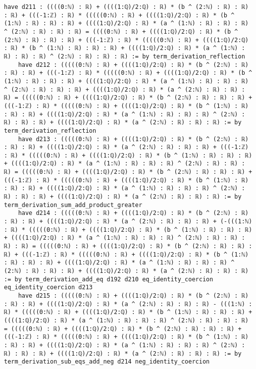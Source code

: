 \documentclass{article}
\begin{document}
\begin{tcolorbox}[colback=white!10, width=\linewidth]
\begin{lstlisting}[language=Lean4]
    have d211 : ((((0:ℕ) : ℝ) + ((((1:ℚ)/2:ℚ) : ℝ) * (b ^ (2:ℕ) : ℝ) : ℝ) : ℝ) + (((-1:ℤ) : ℝ) * (((((0:ℕ) : ℝ) + ((((1:ℚ)/2:ℚ) : ℝ) * (b ^ (1:ℕ) : ℝ) : ℝ) : ℝ) + ((((1:ℚ)/2:ℚ) : ℝ) * (a ^ (1:ℕ) : ℝ) : ℝ) : ℝ) ^ (2:ℕ) : ℝ) : ℝ) : ℝ) = ((((0:ℕ) : ℝ) + ((((1:ℚ)/2:ℚ) : ℝ) * (b ^ (2:ℕ) : ℝ) : ℝ) : ℝ) + (((-1:ℤ) : ℝ) * (((((0:ℕ) : ℝ) + ((((1:ℚ)/2:ℚ) : ℝ) * (b ^ (1:ℕ) : ℝ) : ℝ) : ℝ) + ((((1:ℚ)/2:ℚ) : ℝ) * (a ^ (1:ℕ) : ℝ) : ℝ) : ℝ) ^ (2:ℕ) : ℝ) : ℝ) : ℝ) := by term_derivation_reflection
    have d212 : (((((0:ℕ) : ℝ) + ((((1:ℚ)/2:ℚ) : ℝ) * (b ^ (2:ℕ) : ℝ) : ℝ) : ℝ) + (((-1:ℤ) : ℝ) * (((((0:ℕ) : ℝ) + ((((1:ℚ)/2:ℚ) : ℝ) * (b ^ (1:ℕ) : ℝ) : ℝ) : ℝ) + ((((1:ℚ)/2:ℚ) : ℝ) * (a ^ (1:ℕ) : ℝ) : ℝ) : ℝ) ^ (2:ℕ) : ℝ) : ℝ) : ℝ) + ((((1:ℚ)/2:ℚ) : ℝ) * (a ^ (2:ℕ) : ℝ) : ℝ) : ℝ) = (((((0:ℕ) : ℝ) + ((((1:ℚ)/2:ℚ) : ℝ) * (b ^ (2:ℕ) : ℝ) : ℝ) : ℝ) + (((-1:ℤ) : ℝ) * (((((0:ℕ) : ℝ) + ((((1:ℚ)/2:ℚ) : ℝ) * (b ^ (1:ℕ) : ℝ) : ℝ) : ℝ) + ((((1:ℚ)/2:ℚ) : ℝ) * (a ^ (1:ℕ) : ℝ) : ℝ) : ℝ) ^ (2:ℕ) : ℝ) : ℝ) : ℝ) + ((((1:ℚ)/2:ℚ) : ℝ) * (a ^ (2:ℕ) : ℝ) : ℝ) : ℝ) := by term_derivation_reflection
    have d213 : (((((0:ℕ) : ℝ) + ((((1:ℚ)/2:ℚ) : ℝ) * (b ^ (2:ℕ) : ℝ) : ℝ) : ℝ) + ((((1:ℚ)/2:ℚ) : ℝ) * (a ^ (2:ℕ) : ℝ) : ℝ) : ℝ) + (((-1:ℤ) : ℝ) * (((((0:ℕ) : ℝ) + ((((1:ℚ)/2:ℚ) : ℝ) * (b ^ (1:ℕ) : ℝ) : ℝ) : ℝ) + ((((1:ℚ)/2:ℚ) : ℝ) * (a ^ (1:ℕ) : ℝ) : ℝ) : ℝ) ^ (2:ℕ) : ℝ) : ℝ) : ℝ) = (((((0:ℕ) : ℝ) + ((((1:ℚ)/2:ℚ) : ℝ) * (b ^ (2:ℕ) : ℝ) : ℝ) : ℝ) + (((-1:ℤ) : ℝ) * (((((0:ℕ) : ℝ) + ((((1:ℚ)/2:ℚ) : ℝ) * (b ^ (1:ℕ) : ℝ) : ℝ) : ℝ) + ((((1:ℚ)/2:ℚ) : ℝ) * (a ^ (1:ℕ) : ℝ) : ℝ) : ℝ) ^ (2:ℕ) : ℝ) : ℝ) : ℝ) + ((((1:ℚ)/2:ℚ) : ℝ) * (a ^ (2:ℕ) : ℝ) : ℝ) : ℝ) := by term_derivation_sum_add_product_greater
    have d214 : (((((0:ℕ) : ℝ) + ((((1:ℚ)/2:ℚ) : ℝ) * (b ^ (2:ℕ) : ℝ) : ℝ) : ℝ) + ((((1:ℚ)/2:ℚ) : ℝ) * (a ^ (2:ℕ) : ℝ) : ℝ) : ℝ) + (-(((1:ℕ) : ℝ) * (((((0:ℕ) : ℝ) + ((((1:ℚ)/2:ℚ) : ℝ) * (b ^ (1:ℕ) : ℝ) : ℝ) : ℝ) + ((((1:ℚ)/2:ℚ) : ℝ) * (a ^ (1:ℕ) : ℝ) : ℝ) : ℝ) ^ (2:ℕ) : ℝ) : ℝ) : ℝ) : ℝ) = (((((0:ℕ) : ℝ) + ((((1:ℚ)/2:ℚ) : ℝ) * (b ^ (2:ℕ) : ℝ) : ℝ) : ℝ) + (((-1:ℤ) : ℝ) * (((((0:ℕ) : ℝ) + ((((1:ℚ)/2:ℚ) : ℝ) * (b ^ (1:ℕ) : ℝ) : ℝ) : ℝ) + ((((1:ℚ)/2:ℚ) : ℝ) * (a ^ (1:ℕ) : ℝ) : ℝ) : ℝ) ^ (2:ℕ) : ℝ) : ℝ) : ℝ) + ((((1:ℚ)/2:ℚ) : ℝ) * (a ^ (2:ℕ) : ℝ) : ℝ) : ℝ) := by term_derivation_add_eq d192 d210 eq_identity_coercion eq_identity_coercion d213
    have d215 : (((((0:ℕ) : ℝ) + ((((1:ℚ)/2:ℚ) : ℝ) * (b ^ (2:ℕ) : ℝ) : ℝ) : ℝ) + ((((1:ℚ)/2:ℚ) : ℝ) * (a ^ (2:ℕ) : ℝ) : ℝ) : ℝ) - (((1:ℕ) : ℝ) * (((((0:ℕ) : ℝ) + ((((1:ℚ)/2:ℚ) : ℝ) * (b ^ (1:ℕ) : ℝ) : ℝ) : ℝ) + ((((1:ℚ)/2:ℚ) : ℝ) * (a ^ (1:ℕ) : ℝ) : ℝ) : ℝ) ^ (2:ℕ) : ℝ) : ℝ) : ℝ) = (((((0:ℕ) : ℝ) + ((((1:ℚ)/2:ℚ) : ℝ) * (b ^ (2:ℕ) : ℝ) : ℝ) : ℝ) + (((-1:ℤ) : ℝ) * (((((0:ℕ) : ℝ) + ((((1:ℚ)/2:ℚ) : ℝ) * (b ^ (1:ℕ) : ℝ) : ℝ) : ℝ) + ((((1:ℚ)/2:ℚ) : ℝ) * (a ^ (1:ℕ) : ℝ) : ℝ) : ℝ) ^ (2:ℕ) : ℝ) : ℝ) : ℝ) + ((((1:ℚ)/2:ℚ) : ℝ) * (a ^ (2:ℕ) : ℝ) : ℝ) : ℝ) := by term_derivation_sub_eqs_add_neg d214 neg_identity_coercion

\end{lstlisting}
\end{tcolorbox}
\end{document}
